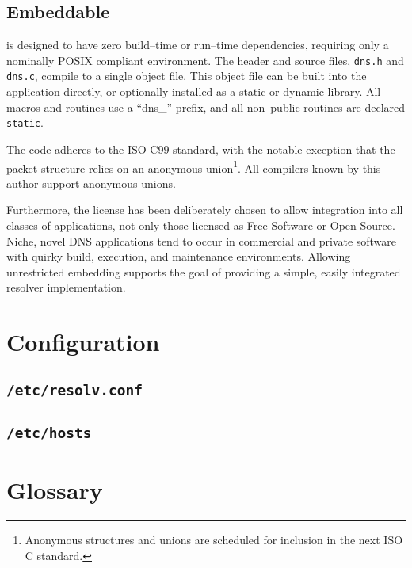 \documentclass[11pt]{article}
\begin{document}
\subsection{Embeddable}

\dnsc is designed to have zero build--time or run--time dependencies,
requiring only a nominally \textsc{POSIX} compliant
environment. The header and source files, \texttt{dns.h} and \texttt{dns.c},
compile to a single object file. This object file can be built into the
application directly, or optionally installed as a static or dynamic
library. All macros and routines use a ``dns\_'' prefix, and all non--public
routines are declared \texttt{static}.

The code adheres to the ISO C99 standard, with the notable exception
that the packet structure relies on an anonymous union\footnote{Anonymous
structures and unions are scheduled for inclusion in the next ISO C
standard.}. All compilers known by this author support anonymous unions.

Furthermore, the license has been deliberately chosen to
allow integration into all classes of applications, not only those licensed
as Free Software or Open Source. Niche, novel DNS applications tend to occur
in commercial and private software with quirky build, execution, and
maintenance environments. Allowing unrestricted embedding supports the goal
of providing a simple, easily integrated resolver implementation.

\section{Configuration}

\subsection{\texttt{/etc/resolv.conf}}

\subsection{\texttt{/etc/hosts}}


\section{Glossary}
\end{document}
